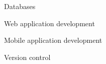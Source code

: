 Databases\\

\divider

Web application development\\

\divider



Mobile application development\\



\divider\smallskip

Version control\\


%
%
%
